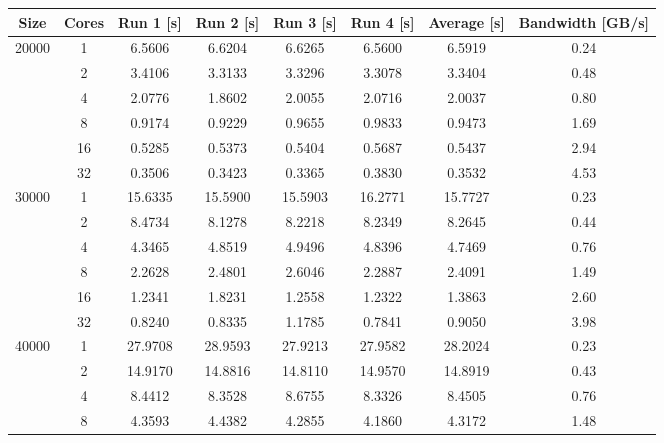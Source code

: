 \begin{tabularx}{\textwidth}{@{} c c c c c c c c @{}}
    \caption{\label{table:transposition}Matrix transposition - run times and bandwidth}\\
    \toprule
        \textbf{Size} & \textbf{Cores} & \textbf{Run 1 [s]} & \textbf{Run 2 [s]} & %
        \textbf{Run 3 [s]} & \textbf{Run 4 [s]} & \textbf{Average [s]} & \textbf{Bandwidth [GB/s]}\\
    \midrule
    \endhead
        \multirow{6}{*}{20000} & 1  & 6.5606 & 6.6204 & 6.6265 & 6.5600 & 6.5919 & 0.24 \\
                               & 2  & 3.4106 & 3.3133 & 3.3296 & 3.3078 & 3.3404 & 0.48 \\
                               & 4  & 2.0776 & 1.8602 & 2.0055 & 2.0716 & 2.0037 & 0.80 \\
                               & 8  & 0.9174 & 0.9229 & 0.9655 & 0.9833 & 0.9473 & 1.69 \\
                               & 16 & 0.5285 & 0.5373 & 0.5404 & 0.5687 & 0.5437 & 2.94 \\
                               & 32 & 0.3506 & 0.3423 & 0.3365 & 0.3830 & 0.3532 & 4.53 \\
    \midrule
        \multirow{6}{*}{30000} & 1  & 15.6335 & 15.5900 & 15.5903 & 16.2771 & 15.7727 & 0.23 \\
                               & 2  & 8.4734  & 8.1278  & 8.2218  & 8.2349  & 8.2645  & 0.44 \\
                               & 4  & 4.3465  & 4.8519  & 4.9496  & 4.8396  & 4.7469  & 0.76 \\
                               & 8  & 2.2628  & 2.4801  & 2.6046  & 2.2887  & 2.4091  & 1.49 \\
                               & 16 & 1.2341  & 1.8231  & 1.2558  & 1.2322  & 1.3863  & 2.60 \\
                               & 32 & 0.8240  & 0.8335  & 1.1785  & 0.7841  & 0.9050  & 3.98 \\
    \midrule
        \multirow{6}{*}{40000} & 1  & 27.9708 & 28.9593 & 27.9213 & 27.9582 & 28.2024 & 0.23 \\
                               & 2  & 14.9170 & 14.8816 & 14.8110 & 14.9570 & 14.8919 & 0.43 \\
                               & 4  & 8.4412  & 8.3528  & 8.6755  & 8.3326  & 8.4505  & 0.76 \\
                               & 8  & 4.3593  & 4.4382  & 4.2855  & 4.1860  & 4.3172  & 1.48 \\

\end{tabularx}
